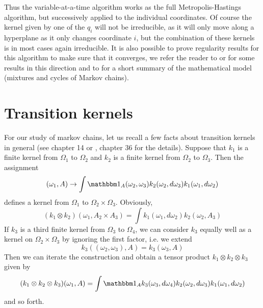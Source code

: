 \documentclass[a4paper, draft]{article}
\theoremstyle{own}
\theoremstyle{remark}
\begin{document}
Thus the variable-at-a-time algorithm works as the full Metropolis-Hastings algorithm, but successively applied to the individual coordinates. Of course the kernel given by one of the $q_i$ will not be irreducible, as it will only move along a hyperplane as it only changes coordinate $i$, but the combination of these kernels is in most cases again irreducible. It is also possible to prove regularity results for this algorithm to make sure that it converges, we refer the reader to \cite{RobertsRosenthal2006} or \cite{ChanGeyer1994} for some results in this direction and to \cite{Neal1993} for a short summary of the mathematical model (mixtures and cycles of Markov chains). 




\appendix


\section{Transition kernels}
\label{sec:transitionkernels}


For our study of markov chains, let us recall a few facts about transition kernels in general (see \cite{Klenke} chapter 14 or \cite{Bauer}, chapter 36 for the details). Suppose that $k_1$ is a finite kernel from $\Omega_1$ to $\Omega_2$ and $k_2$ is a finite kernel from $\Omega_2$ to $\Omega_3$. Then the assignment
$$
(\omega_1, A) \rightarrow \int {\mathbbm 1}_A (\omega_2, \omega_3) k_2(\omega_2, d\omega_3) k_1(\omega_1, d\omega_2)
$$
defines a kernel from $\Omega_1$ to $\Omega_2 \times \Omega_3$. Obviously,
$$
(k_1 \otimes k_2)(\omega_1, A_2 \times A_3) = \int k_1(\omega_1, d\omega_2) k_2(\omega_2, A_3)
$$
If $k_3$ is a third finite kernel from $\Omega_3$ to $\Omega_4$, we can consider $k_3$ equally well as a kernel on $\Omega_2 \times \Omega_3$ by ignoring the first factor, i.e. we extend
$$
k_3((\omega_2, \omega_3),A) =  k_3(\omega_3, A)
$$
Then we can iterate the construction and obtain a tensor product $k_1 \otimes k_2 \otimes k_3$ given by
$$
(k_1 \otimes k_2 \otimes k_3)(\omega_1, A) = \int {\mathbbm 1}_A k_3(\omega_3, d\omega_4)k_2(\omega_2, d\omega_3)k_1(\omega_1, d\omega_2)
$$
and so forth.
\end{document}
